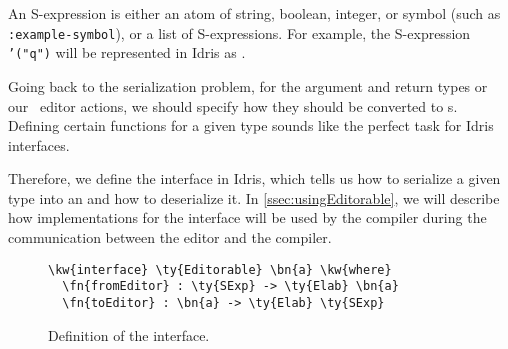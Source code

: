 An S-expression is either an atom of string, boolean, integer, or symbol (such
as \texttt{:example-symbol}), or a list of S-expressions.
For example, the S-expression \texttt{'("q")} will be represented in Idris as
\mbox{}.

Going back to the serialization problem, for the argument and return types or
our \Elab\ editor actions, we should specify how they should be converted to
s.  Defining certain functions for a given type sounds like the
perfect task for Idris interfaces.

Therefore, we define the interface  in Idris, which tells us
how to serialize a given type into an  and how to deserialize it.
In \autoref{ssec:usingEditorable}, we will describe how implementations for
the  interface will be used by the compiler during the
communication between the editor and the compiler.

\begin{figure}[H]
\begin{Verbatim}
\kw{interface} \ty{Editorable} \bn{a} \kw{where}
  \fn{fromEditor} : \ty{SExp} -> \ty{Elab} \bn{a}
  \fn{toEditor} : \bn{a} -> \ty{Elab} \ty{SExp}
\end{Verbatim}
\caption{Definition of the  interface.}
\label{code:editorable}
\end{figure}


